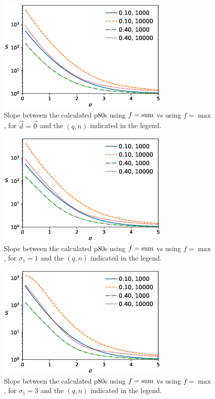 \documentclass[reprint,aps,prl,amsmath,amssymb,superscriptaddress,showpacs]{revtex4-1}
\begin{document}
\begin{figure}[t]
\includegraphics[width=3.3in]{maxsum.scheduling.dupsplit.arc_distribution_zero.eps}
\caption{Slope between the calculated p80s using $f={\rm sum}$ vs using $f={\max}$, for $\vec{d}=\vec{0}$ and the $(q,n)$ indicated in the legend.}
\label{fig1}
\end{figure}

\begin{figure}[t]
\includegraphics[width=3.3in]{maxsum.scheduling.dupsplit.arc_distribution_lognormal.arc_sigma_1.eps}
\caption{Slope between the calculated p80s using $f={\rm sum}$ vs using $f={\max}$, for $\sigma_1=1$ and the $(q,n)$ indicated in the legend. }
\label{fig2}
\end{figure}

\begin{figure}[t]
\includegraphics[width=3.3in]{maxsum.scheduling.dupsplit.arc_distribution_lognormal.arc_sigma_3.eps}
\caption{Slope between the calculated p80s using $f={\rm sum}$ vs using $f={\max}$, for $\sigma_1=3$ and the $(q,n)$ indicated in the legend. }
\label{fig3}
\end{figure}
\end{document}
